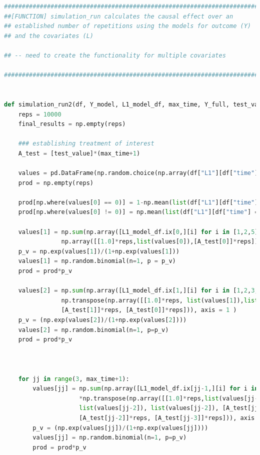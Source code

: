 \begin{lstlisting}[language=Python]
#########################################################################
##[FUNCTION] simulation_run calculates the causal effect over an  
## established number of repetitions using the models for outcome (Y) 
## and the covariates (L) 

## -- need to create the functionality for multiple covariates

#########################################################################


def simulation_run2(df, Y_model, L1_model_df, max_time, Y_full, test_value): 
    reps = 10000
    final_results = np.empty(reps) 

    ### establishing treatment of interest
    A_test = [test_value]*(max_time+1) 

    values = pd.DataFrame(np.random.choice(np.array(df["L1"][df["time"] == 0]), reps))
    prod = np.empty(reps) 
    
    prod[np.where(values[0] == 0)] = 1-np.mean(list(df["L1"][df["time"] == 0]))
    prod[np.where(values[0] != 0)] = np.mean(list(df["L1"][df["time"] == 0]))

    values[1] = np.sum(np.array([L1_model_df.ix[0,][i] for i in [1,2,5]])*np.transpose(\
                np.array([[1.0]*reps,list(values[0]),[A_test[0]]*reps])), axis = 1)
    p_v = np.exp(values[1])/(1+np.exp(values[1]))
    values[1] = np.random.binomial(n=1, p = p_v)
    prod = prod*p_v
    
    values[2] = np.sum(np.array([L1_model_df.ix[1,][i] for i in [1,2,3,5,6]])*\
                np.transpose(np.array([[1.0]*reps, list(values[1]),list(values[0]), \
                [A_test[1]]*reps, [A_test[0]]*reps])), axis = 1 )
    p_v = (np.exp(values[2])/(1+np.exp(values[2]))) 
    values[2] = np.random.binomial(n=1, p=p_v)
    prod = prod*p_v
    
                                                               

    for jj in range(3, max_time+1):
        values[jj] = np.sum(np.array([L1_model_df.ix[jj-1,][i] for i in range(1,8)])\
                     *np.transpose(np.array([[1.0]*reps,list(values[jj-1]),\
                     list(values[jj-2]), list(values[jj-2]), [A_test[jj-1]]*reps, \
                     [A_test[jj-2]]*reps, [A_test[jj-3]]*reps])), axis = 1)
        p_v = (np.exp(values[jj])/(1+np.exp(values[jj]))) 
        values[jj] = np.random.binomial(n=1, p=p_v)
        prod = prod*p_v


\end{lstlisting}
